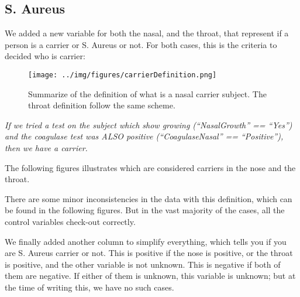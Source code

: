 	\subsection{S. Aureus}

	We added a new variable for both the nasal, and the throat, that represent if a person is a carrier or S. Aureus or not. For both cases, this is the criteria to decided who is carrier: \vspace{3 mm}

\begin{figure}[H]
{
    \centering

    \label{fig:carrier_nasal_definition_cleaning_summary}

    \texttt{[image: ../img/figures/carrierDefinition.png]}
    \caption{Summarize of the definition of what is a nasal carrier subject. The throat definition follow the same scheme.}
}
\medskip
\end{figure}

	\textit{If we tried a test on the subject which show growing (“NasalGrowth” == “Yes”) and the coagulase test was ALSO positive (“CoagulaseNasal” == “Positive”), then we have a carrier.} \vspace{3 mm}

	The following figures illustrates which are considered carriers in the nose and the throat.\vspace{3 mm}





	There are some minor inconsistencies in the data with this definition, which can be found in the following figures. But in the vast majority of the cases, all the control variables check-out correctly.\vspace{3 mm}




	
	We finally added another column to simplify everything, which tells you if you are S. Aureus carrier or not. This is positive if the nose is positive, or the throat is positive, and the other variable is not unknown. This is negative if both of them are negative. If either of them is unknown, this variable is unknown; but at the time of writing this, we have no such cases.\vspace{3 mm}



